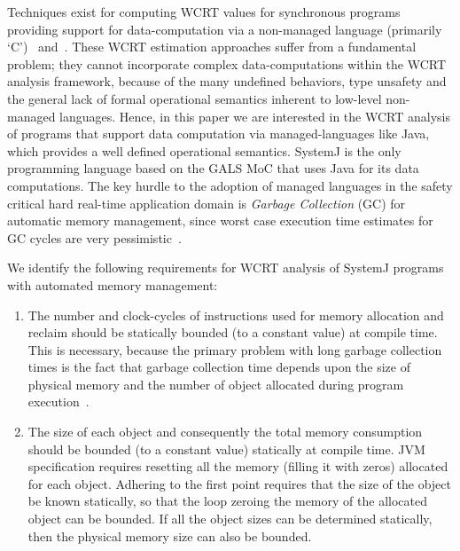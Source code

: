 Techniques exist for computing WCRT values for synchronous programs
providing support for data-computation via a non-managed language
(primarily `C')~\cite{boldt07} and~\cite{proop10}. These WCRT estimation
approaches suffer from a fundamental problem; they cannot incorporate
complex data-computations within the WCRT analysis framework, because of
the many undefined behaviors, type unsafety and the general lack of
formal operational semantics inherent to low-level non-managed
languages. Hence, in this paper we are interested in the WCRT analysis
of programs that support data computation via managed-languages like
Java, which provides a well defined operational semantics. {\color{red}
  SystemJ is the only programming language based on the GALS MoC that
  uses Java for its data computations.} The key hurdle to the adoption
of managed languages in the safety critical hard real-time application
domain is \textit{Garbage Collection} (GC) for automatic memory
management, since worst case execution time estimates for GC cycles are
very pessimistic~\cite{puffitsch2013design}.

{\color{black}

  We identify the following requirements for WCRT analysis of SystemJ
  programs with automated memory management:

  \begin{enumerate}

  \item The number and clock-cycles of instructions used for memory
    allocation and reclaim should be statically bounded (to a constant
    value) at compile time. This is necessary, because the primary
    problem with long garbage collection times is the fact that garbage
    collection time depends upon the size of physical memory and the
    number of object allocated during program
    execution~\cite{schoeberl2010scheduling}.

  \item The size of each object and consequently the total memory
    consumption should be bounded (to a constant value) statically at
    compile time. JVM specification requires resetting all the memory
    (filling it with zeros) allocated for each object. Adhering to the
    first point requires that the size of the object be known
    statically, so that the loop zeroing the memory of the allocated
    object can be bounded. If all the object sizes can be determined
    statically, then the physical memory size can also be bounded.

  \end{enumerate}

}

